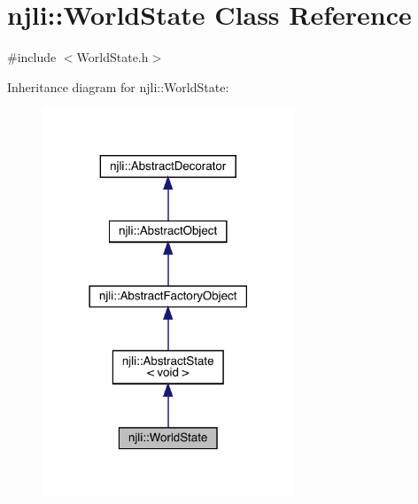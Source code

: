 \hypertarget{classnjli_1_1_world_state}{}\section{njli\+:\+:World\+State Class Reference}
\label{classnjli_1_1_world_state}


{\ttfamily \#include $<$World\+State.\+h$>$}



Inheritance diagram for njli\+:\+:World\+State\+:\nopagebreak
\begin{figure}[H]
\begin{center}
\leavevmode
\includegraphics[width=213pt]{classnjli_1_1_world_state__inherit__graph}
\end{center}
\end{figure}


